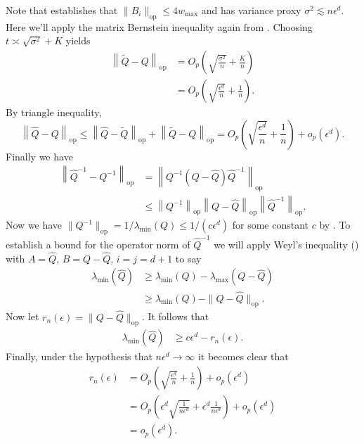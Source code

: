 \documentclass[11pt]{article}
\begin{document}
Note that  establishes that $\|B_i\|_{\text{op}} \leq 4w_{\max}$ and has variance proxy $\sigma^2 \lesssim n\epsilon^d$. Here we'll apply the matrix Bernstein inequality again from . Choosing $t \asymp \sqrt{\sigma^2} + K$ yields
\begin{align*}
    \left\|\tilde{Q} - Q\right\|_{\text{op}} &= O_p\left(\sqrt{\frac{\sigma^2}{n}} + \frac{K}{n}\right) \\
    &= O_p\left(\sqrt{\frac{\epsilon^d}{n}} + \frac{1}{n}\right).
\end{align*}
By triangle inequality,
\begin{equation*}
    \left\|\hat{Q} - Q\right\|_{\text{op}} \leq  \left\|\hat{Q} - \tilde Q\right\|_{\text{op}} + \left\|\tilde{Q} - Q\right\|_{\text{op}} = O_p\left(\sqrt{\frac{\epsilon^d}{n}} + \frac{1}{n}\right) + o_p(\epsilon^d).
\end{equation*}
Finally we have
\begin{align*}
    \left\|\hat{Q}^{-1} - Q^{-1}\right\|_{\text{op}} &= \left\|Q^{-1}\left(Q - \hat{Q}\right)\hat{Q}^{-1}\right\|_{\text{op}} \\
    &\leq \left\|Q^{-1}\right\|_{\text{op}}\left\|Q - \hat{Q}\right\|_{\text{op}}\left\|\hat{Q}^{-1}\right\|_{\text{op}}.
\end{align*}
Now we have $\|Q^{-1}\|_{\text{op}} = 1/\lambda_{\min}(Q) \leq 1/(c\epsilon^{d})$ for some constant $c$ by . To establish a bound for the operator norm of $\hat Q^{-1}$ we will apply Weyl's inequality () with $A = \hat{Q}$, $B = Q - \hat{Q}$, $i = j = d+1$ to say
\begin{align*}
    \lambda_{\min}(\hat{Q}) &\geq \lambda_{\min}(Q) - \lambda_{\max}(Q-\hat{Q}) \\
    &\geq  \lambda_{\min}(Q) - \|Q-\hat{Q}\|_{\text{op}}.
\end{align*}
Now let $r_n(\epsilon) = \|Q-\hat{Q}\|_{\text{op}}$. It follows that
\begin{align*}
    \lambda_{\min}(\hat{Q}) &\geq  c\epsilon^d - r_n(\epsilon).
\end{align*}
Finally, under the hypothesis that $n\epsilon^d \rightarrow \infty$ it becomes clear that
\begin{align*}
    r_n(\epsilon) &= O_p\left(\sqrt{\frac{\epsilon^d}{n}} + \frac{1}{n}\right) + o_p(\epsilon^d) \\
    &= O_p\left(\epsilon^d\sqrt{\frac{1}{n\epsilon^d}} + 
    \epsilon^d\frac{1}{n\epsilon^d}\right) + o_p(\epsilon^d) \\
    &= o_p(\epsilon^d).
\end{align*}
\end{document}
